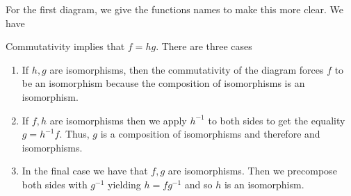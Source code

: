 \documentclass{article}
\begin{document}
\begin{solution}{\parindent}
  For the first diagram, we give the functions names to make this more
  clear. We have
  \begin{center}
  \end{center}
  Commutativity implies that $f = hg$. There are three cases
  \begin{enumerate}
  \item If $h,g$ are isomorphisms, then the commutativity of the
    diagram forces $f$ to be an isomorphism because the composition of
    isomorphisms is an isomorphism.
  \item If $f,h$ are isomorphisms then we apply $h^{-1}$ to both sides
    to get the equality $g = h^{-1}f$. Thus, $g$ is a composition of
    isomorphisms and therefore and isomorphisms.
  \item In the final case we have that $f,g$ are isomorphisms. Then we
    precompose both sides with $g^{-1}$ yielding $h = fg^{-1}$ and so
    $h$ is an isomorphism.
  \end{enumerate}


\end{solution}
\end{document}
